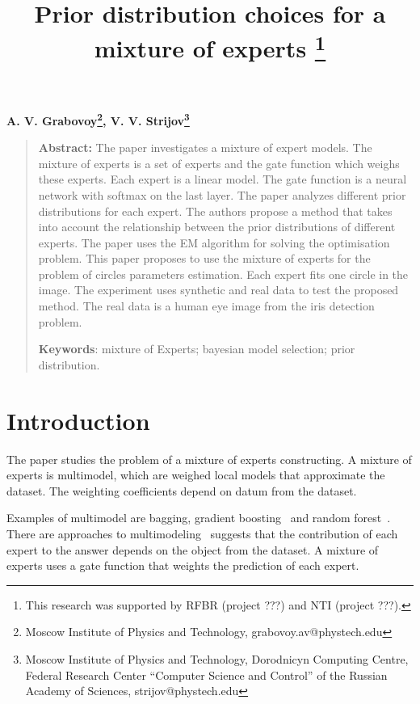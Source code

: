 \documentclass[12pt, twoside]{article}
\numberwithin{equation}{section}
\begin{document}
\title{\bf Prior distribution choices for a mixture of experts \thanks{This research was supported by RFBR (project ???) and NTI (project ???).}}
\date{}
\author{}
\maketitle

\begin{center}
\bf
A. V. Grabovoy\footnote{Moscow Institute of Physics and Technology, grabovoy.av@phystech.edu},
V. V. Strijov\footnote{Moscow Institute of Physics and Technology, Dorodnicyn Computing Centre, Federal Research Center “Computer Science and Control” of the Russian Academy of Sciences, strijov@phystech.edu}
\end{center}
{\centering\begin{quote}
\textbf{Abstract:} 
The paper investigates a mixture of expert models. 
The mixture of experts is a set of experts and the gate function which weighs these experts. Each expert is a linear model.
The gate function is a neural network with softmax on the last layer. 
The paper analyzes different prior distributions for each expert.
The authors propose a method that takes into account the relationship between the prior distributions of different experts.
The paper uses the EM algorithm for solving the optimisation problem.
This paper proposes to use the mixture of experts for the problem of circles parameters estimation.
Each expert fits one circle in the image.
The experiment uses synthetic and real data to test the proposed method.
The real data is a human eye image from the iris detection problem.


\smallskip
\textbf{Keywords}: mixture of Experts; bayesian model selection; prior distribution.

\smallskip
\end{quote}
}

\section{Introduction}
The paper studies the problem of a mixture of experts constructing. A mixture of experts is multimodel, which are weighed local models that approximate the dataset. The weighting coefficients depend on datum from the dataset.

Examples of multimodel are bagging, gradient boosting~\cite{Tianqi2016} and random forest~\cite{Ishwaran2012}. There are approaches to multimodeling~\cite{Yuksel2012} suggests that the contribution of each expert to the answer depends on the object from the dataset. A mixture of experts uses a gate function that weights the prediction of each expert.
\end{document}
